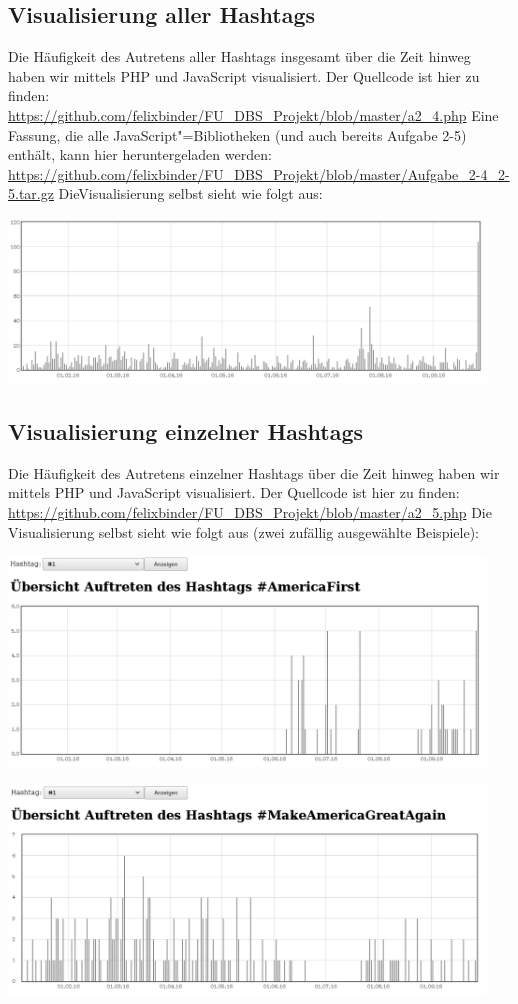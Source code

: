 \documentclass[BCOR0mm,fontsize=12pt,paper=a4,final,numbers=noenddot]{scrartcl}
\begin{document}
\subsection{Visualisierung aller Hashtags}

Die Häufigkeit des Autretens aller Hashtags insgesamt über die Zeit hinweg haben wir mittels PHP und JavaScript visualisiert. Der Quellcode ist hier zu finden: \url{https://github.com/felixbinder/FU_DBS_Projekt/blob/master/a2_4.php} Eine Fassung, die alle JavaScript"=Bibliotheken (und auch bereits Aufgabe 2-5) enthält, kann hier heruntergeladen werden: \url{https://github.com/felixbinder/FU_DBS_Projekt/blob/master/Aufgabe_2-4_2-5.tar.gz} Die\linebreak Visualisierung selbst sieht wie folgt aus:

\includegraphics[width=0.95\textwidth]{a2_4.png}

\subsection{Visualisierung einzelner Hashtags}

Die Häufigkeit des Autretens einzelner Hashtags über die Zeit hinweg haben wir mittels PHP und JavaScript visualisiert. Der Quellcode ist hier zu finden: \url{https://github.com/felixbinder/FU_DBS_Projekt/blob/master/a2_5.php} Die Visualisierung selbst sieht wie folgt aus (zwei zufällig ausgewählte Beispiele):

\includegraphics[width=0.95\textwidth]{a2_5_1.png}

\includegraphics[width=0.95\textwidth]{a2_5_2.png}
\end{document}
